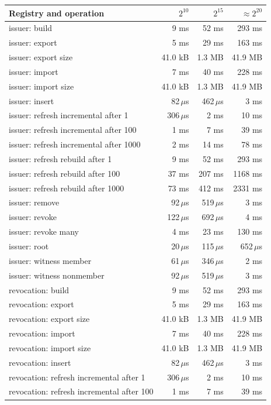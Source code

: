 \begin{tabular}{lrrr}
\toprule
Registry and operation & $2^{10}$ & $2^{15}$ & $\approx 2^{20}$ \\
\midrule
issuer: build & 9 ms & 52 ms & 293 ms \\
issuer: export & 5 ms & 29 ms & 163 ms \\
issuer: export size & 41.0 kB & 1.3 MB & 41.9 MB \\
issuer: import & 7 ms & 40 ms & 228 ms \\
issuer: import size & 41.0 kB & 1.3 MB & 41.9 MB \\
issuer: insert & 82\,$\mu$s & 462\,$\mu$s & 3 ms \\
issuer: refresh incremental after 1 & 306\,$\mu$s & 2 ms & 10 ms \\
issuer: refresh incremental after 100 & 1 ms & 7 ms & 39 ms \\
issuer: refresh incremental after 1000 & 2 ms & 14 ms & 78 ms \\
issuer: refresh rebuild after 1 & 9 ms & 52 ms & 293 ms \\
issuer: refresh rebuild after 100 & 37 ms & 207 ms & 1168 ms \\
issuer: refresh rebuild after 1000 & 73 ms & 412 ms & 2331 ms \\
issuer: remove & 92\,$\mu$s & 519\,$\mu$s & 3 ms \\
issuer: revoke & 122\,$\mu$s & 692\,$\mu$s & 4 ms \\
issuer: revoke many & 4 ms & 23 ms & 130 ms \\
issuer: root & 20\,$\mu$s & 115\,$\mu$s & 652\,$\mu$s \\
issuer: witness member & 61\,$\mu$s & 346\,$\mu$s & 2 ms \\
issuer: witness nonmember & 92\,$\mu$s & 519\,$\mu$s & 3 ms \\
revocation: build & 9 ms & 52 ms & 293 ms \\
revocation: export & 5 ms & 29 ms & 163 ms \\
revocation: export size & 41.0 kB & 1.3 MB & 41.9 MB \\
revocation: import & 7 ms & 40 ms & 228 ms \\
revocation: import size & 41.0 kB & 1.3 MB & 41.9 MB \\
revocation: insert & 82\,$\mu$s & 462\,$\mu$s & 3 ms \\
revocation: refresh incremental after 1 & 306\,$\mu$s & 2 ms & 10 ms \\
revocation: refresh incremental after 100 & 1 ms & 7 ms & 39 ms \\

\end{tabular}
